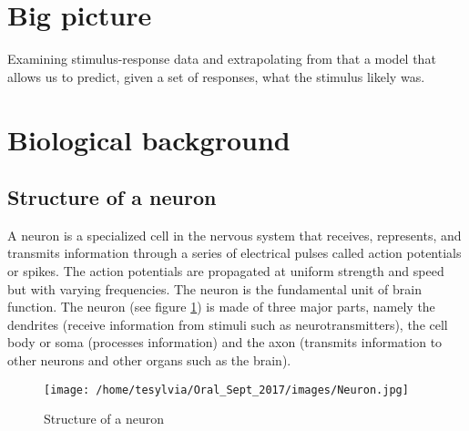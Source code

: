 
\section{Big picture}
 
Examining stimulus-response data and extrapolating from that a model
that allows us to predict, given a set of responses, what the stimulus 
likely was.






\section{Biological background}
\subsection{Structure of a neuron}
A neuron is a specialized cell in the nervous system that receives, represents, and transmits information through a series of electrical pulses called action potentials or spikes. The action potentials are propagated at uniform strength and speed but with varying frequencies. The neuron is the fundamental unit of brain function. The neuron (see  figure \ref{fig:Neuron}) is made of three major parts, namely the dendrites (receive information from stimuli such as neurotransmitters), the cell body or soma (processes information) and the axon (transmits information to other neurons and other organs such as the brain).

\begin{figure}[h!]
\caption{Structure of  a neuron}
\texttt{[image: /home/tesylvia/Oral\_Sept\_2017/images/Neuron.jpg]}
      \label{fig:Neuron}
\end{figure}


